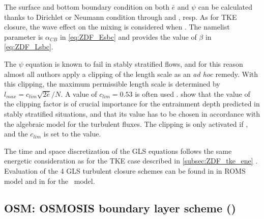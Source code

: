 \documentclass[../main/NEMO_manual]{subfiles}
\begin{document}
The surface and bottom boundary condition on both $\bar{e}$ and $\psi$ can be calculated thanks to Dirichlet or
Neumann condition through  and , resp.
As for TKE closure, the wave effect on the mixing is considered when
 \citep{craig.banner_JPO94, mellor.blumberg_JPO04}.
The  namelist parameter is $\alpha_{CB}$ in \autoref{eq:ZDF_Esbc} and
 provides the value of $\beta$ in \autoref{eq:ZDF_Lsbc}.

The $\psi$ equation is known to fail in stably stratified flows, and for this reason
almost all authors apply a clipping of the length scale as an \textit{ad hoc} remedy.
With this clipping, the maximum permissible length scale is determined by $l_{max} = c_{lim} \sqrt{2\bar{e}}/ N$.
A value of $c_{lim} = 0.53$ is often used \citep{galperin.kantha.ea_JAS88}.
\cite{umlauf.burchard_CSR05} show that the value of the clipping factor is of crucial importance for
the entrainment depth predicted in stably stratified situations,
and that its value has to be chosen in accordance with the algebraic model for the turbulent fluxes.
The clipping is only activated if ,
and the $c_{lim}$ is set to the  value.

The time and space discretization of the GLS equations follows the same energetic consideration as for
the TKE case described in \autoref{subsec:ZDF_tke_ene} \citep{burchard_OM02}.
Evaluation of the 4 GLS turbulent closure schemes can be found in \citet{warner.sherwood.ea_OM05} in ROMS model and
 in \citet{reffray.bourdalle-badie.ea_GMD15} for the \NEMO\ model.

\subsection[OSM: OSMOSIS boundary layer scheme (\forcode{ln_zdfosm = .true.})]
{OSM: OSMOSIS boundary layer scheme (\protect{})}
\label{subsec:ZDF_osm}

\begin{listing}
  \caption{}
  \label{lst:namzdf_osm}
\end{listing}
\end{document}
